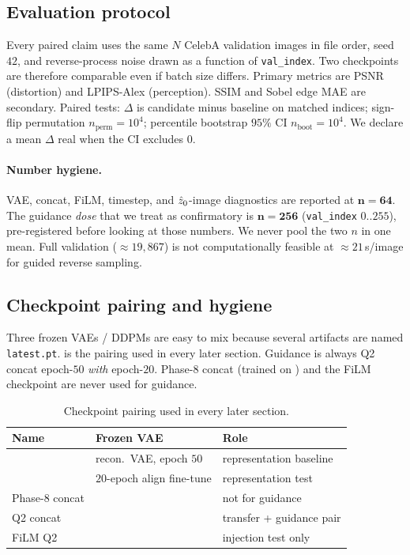 \subsection{Evaluation protocol}
\label{sec:eval}

Every paired claim uses the same $N$ CelebA validation images in file
order, seed~$42$, and reverse-process noise drawn as a function of
\texttt{val\_index}.
Two checkpoints are therefore comparable even if batch size differs.
Primary metrics are PSNR (distortion) and LPIPS-Alex
\citep{zhang2018unreasonable} (perception).
SSIM and Sobel edge MAE are secondary.
Paired tests: $\Delta$ is candidate minus baseline on matched
indices; sign-flip permutation $n_{\mathrm{perm}}{=}10^{4}$;
percentile bootstrap $95\%$ CI $n_{\mathrm{boot}}{=}10^{4}$.
We declare a mean $\Delta$ real when the CI excludes $0$.

\paragraph{Number hygiene.}
VAE, concat, FiLM, timestep, and $\hat{z}_{0}$-image diagnostics are
reported at $\mathbf{n{=}64}$.
The guidance \emph{dose} that we treat as confirmatory is
$\mathbf{n{=}256}$ (\texttt{val\_index} $0..255$), pre-registered
before looking at those numbers.
We never pool the two $n$ in one mean.
Full validation ($\approx 19{,}867$) is not computationally feasible
at $\approx 21$\,s/image for guided reverse sampling.

\subsection{Checkpoint pairing and hygiene}
\label{sec:setup-hygiene}

Three frozen VAEs / DDPMs are easy to mix because several artifacts
are named \texttt{latest.pt}.
 is the pairing used in every later section.
Guidance is always Q2 concat epoch-$50$ \emph{with} \vaesr{}
epoch-$20$.
Phase-8 concat (trained on \vaeone) and the FiLM checkpoint are
never used for guidance.

\begin{table}[htbp]
  \centering
  \caption{Checkpoint pairing used in every later section.}
  \label{tab:ckpts}
  \small
  \setlength{\tabcolsep}{4pt}
  \begin{tabularx}{\columnwidth}{@{}lXX@{}}
    \toprule
    Name & Frozen VAE & Role \\
    \midrule
    \vaeone{} & recon.\ VAE, epoch $50$ & representation baseline \\
    \vaesr{} & $20$-epoch align fine-tune & representation test \\
    Phase-8 concat & \vaeone{} & not for guidance \\
    Q2 concat & \vaesr{} & transfer + guidance pair \\
    FiLM Q2 & \vaesr{} & injection test only \\
    \bottomrule
  \end{tabularx}
\end{table}

